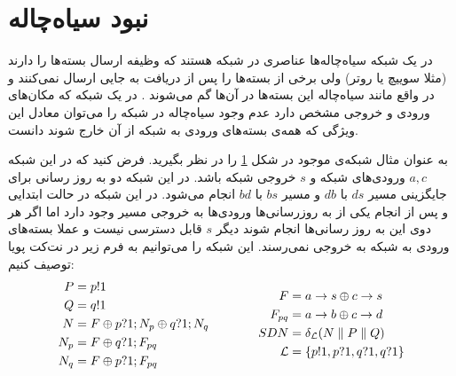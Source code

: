 \section{نبود سیاه‌چاله}
در یک شبکه سیاه‌چاله‌ها
عناصری در شبکه هستند که وظیفه ارسال بسته‌ها را دارند
(مثلا سوییچ‌ یا روتر)
ولی برخی از بسته‌ها را پس از دریافت به جایی ارسال نمی‌کنند و در واقع مانند سیاه‌چاله این بسته‌ها در آن‌ها گم می‌شوند
\cite{network-abstractions}.
در یک شبکه که مکان‌های ورودی و خروجی مشخص دارد عدم وجود سیاه‌چاله در شبکه را می‌توان معادل این ويژگی که همه‌ی بسته‌های ورودی به شبکه از آن خارج شوند دانست.
\begin{figure}
    \centering
    \caption{ }
    \label{fig:blackhole}
\end{figure}
به عنوان مثال شبکه‌ی موجود در شکل
\ref{fig:blackhole}
را در نظر بگیرید.
فرض کنید که در این شبکه
$a,c$
ورودی‌های شبکه و
$s$
خروجی شبکه باشد.
در این شبکه دو به روز رسانی برای جایگزینی
مسیر
$ds$
با
$db$
و مسیر
$bs$
با
$bd$
انجام می‌شود.
در این شبکه در حالت ابتدایی و پس از انجام یکی از به روز‌رسانی‌ها ورودی‌ها به خروجی مسیر وجود دارد اما اگر هر دوی این به روز رسانی‌ها انجام شوند دیگر
$s$
قابل دسترسی نیست و عملا بسته‌های ورودی به شبکه به خروجی نمی‌رسند.
این شبکه را می‌توانیم به فرم زیر در نت‌کت پویا توصیف کنیم:
\begin{equation*}
    \begin{aligned}[c]
        P   & = p!1                             \\
        Q   & = q!1                             \\
        N   & = F \oplus p?1;N_p \oplus q?1;N_q \\
        N_p & = F \oplus q?1;F_{pq}             \\
        N_q & = F \oplus p?1;F_{pq}
    \end{aligned}
    \qquad\qquad
    \begin{aligned}[c]
        F           & = a\rightarrow s \oplus c\rightarrow s            \\
        F_{pq}      & = a\rightarrow b \oplus c\rightarrow d            \\
        SDN         & = \delta_{\mathcal{L}} (N
        \parallel P \parallel Q)                \\
        \mathcal{L} & = \{p!1,p?1,q?1,q?1\}
    \end{aligned}
\end{equation*}
